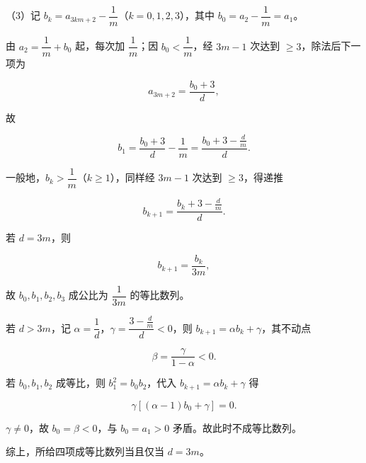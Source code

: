 \begin{answer}
（3）记 $b_k=a_{3km+2}-\dfrac1m$（$k=0,1,2,3$），其中 $b_0=a_2-\dfrac1m=a_1$。

由 $a_2=\dfrac1m+b_0$ 起，每次加 $\dfrac1m$；因 $b_0<\dfrac1m$，经 $3m-1$ 次达到 $\geqslant3$，除法后下一项为

\nopagebreak[4]
\[a_{3m+2}=\frac{b_0+3}{d},\]

故

\nopagebreak[4]
\[b_1=\frac{b_0+3}{d}-\frac1m=\frac{b_0+3-\frac dm}{d}.\]

一般地，$b_k>\dfrac1m$（$k\geqslant1$），同样经 $3m-1$ 次达到 $\geqslant3$，得递推

\nopagebreak[4]
\[b_{k+1}=\frac{b_k+3-\frac dm}{d}.\]

若 $d=3m$，则

\nopagebreak[4]
\[b_{k+1}=\frac{b_k}{3m},\]

故 $b_0,b_1,b_2,b_3$ 成公比为 $\dfrac1{3m}$ 的等比数列。

若 $d>3m$，记 $\alpha=\dfrac1d$，$\gamma=\dfrac{3-\frac dm}{d}<0$，则 $b_{k+1}=\alpha b_k+\gamma$，其不动点

\nopagebreak[4]
\[\beta=\frac{\gamma}{1-\alpha}<0.\]

若 $b_0,b_1,b_2$ 成等比，则 $b_1^2=b_0b_2$，代入 $b_{k+1}=\alpha b_k+\gamma$ 得

\nopagebreak[4]
\[\gamma\left[(\alpha-1)b_0+\gamma\right]=0.\]

$\gamma\neq0$，故 $b_0=\beta<0$，与 $b_0=a_1>0$ 矛盾。故此时不成等比数列。

综上，所给四项成等比数列当且仅当 $d=3m$。


\end{answer}
